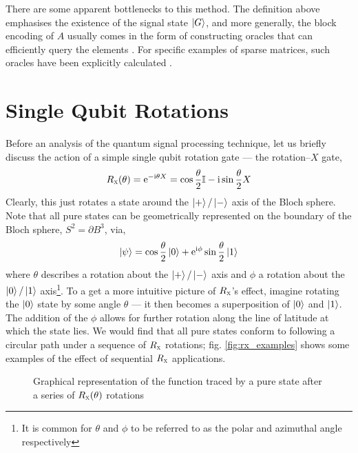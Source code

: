 \documentclass{article}
\begin{document}
There are some apparent bottlenecks to this method. The definition above emphasises the existence of the signal state $\ket{G}$, and more generally, the block encoding of $A$ usually comes in the form of constructing oracles that can efficiently query the elements \cite{BCK15,CKS17}. For specific examples of sparse matrices, such oracles have been explicitly calculated \cite{CLBY23}. 

\clearpage
\section{Single Qubit Rotations}
Before an analysis of the quantum signal processing technique, let us briefly discuss the action of a simple single qubit rotation gate --- the rotation--$X$ gate,
\begin{equation}\label{eq:rotX}
    R_{\textsc{x}}(\theta) = \mathrm{e}^{-\mathrm{i} \theta X} = \cos\frac{\theta}{2}\mathbb{I} - \mathrm{i}\sin\frac{\theta}{2}X
\end{equation}
Clearly, this just rotates a state around the $\ket{+}/\ket{-}$ axis of the Bloch sphere. Note that all pure states can be geometrically represented on the boundary of the Bloch sphere, $S^2 = \partial B^3$, via,
\begin{equation}
    \ket{\psi} = \cos\frac{\theta}{2}\ket{0} + \mathrm{e}^{\mathrm{i} \phi}\sin\frac{\theta}{2}\ket{1}
\end{equation}
where $\theta$ describes a rotation about the $\ket{+}/\ket{-}$ axis and $\phi$ a rotation about the $\ket{0}/\ket{1}$ axis\footnote{It is common for $\theta$ and $\phi$ to be referred to as the polar and azimuthal angle respectively}. To a get a more intuitive picture of $R_{\textsc{x}}$'s effect, imagine rotating the $\ket{0}$ state by some angle $\theta$ --- it then becomes a superposition of $\ket{0}$ and $\ket{1}$. The addition of the $\phi$ allows for further rotation along the line of latitude at which the state lies. We would find that all pure states conform to following a circular path under a sequence of $R_{\textsc{x}}$ rotations; fig. \ref{fig:rx_examples} shows some examples of the effect of sequential $R_{\textsc{x}}$ applications. 

\begin{figure}[h!]
    \centering
    \caption{Graphical representation of the function traced by a pure state after a series of $R_{\textsc{x}}(\theta)$ rotations}
    \label{fig:cos}
\end{figure}
\end{document}
